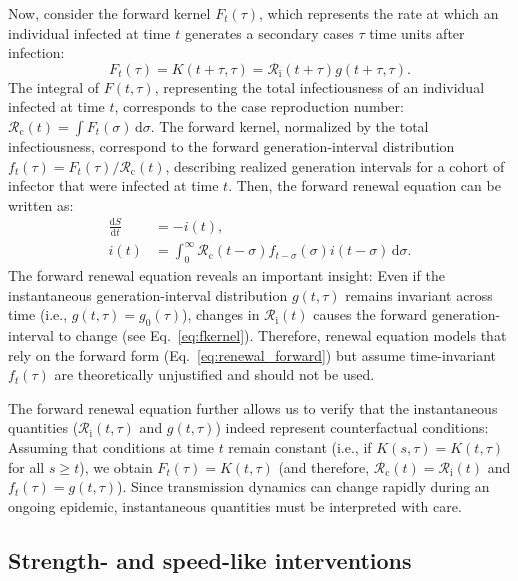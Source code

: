 \documentclass[12pt]{article}
\newcommand{\eref}[1]{Eq.~\ref{eq:#1}}
\newcommand{\Rx}[1]{\ensuremath{{\mathcal R}_{#1}}\xspace}
\newcommand{\Rc}{\Rx{\mathrm{c}}}
\newcommand{\Ri}{\Rx{\mathrm{i}}}
\newcommand{\dd}[1]{\ensuremath{\, \mathrm{d}#1}}
\newcommand{\dsigma}{\dd{\sigma}}
\begin{document}
Now, consider the forward kernel $F_t(\tau)$, which represents the rate at which an individual infected at time $t$ generates a secondary cases $\tau$ time units after infection: 
\begin{equation}
F_t(\tau) = K(t+\tau, \tau) = \Ri(t + \tau) g(t+\tau, \tau).
\label{eq:fkernel}
\end{equation}
The integral of $F(t, \tau)$, representing the total infectiousness of an individual infected at time $t$, corresponds to the case reproduction number: $\Rc(t) = \int F_t(\sigma) \dsigma$. 
The forward kernel, normalized by the total infectiousness, correspond to the forward generation-interval distribution $f_t(\tau) = F_t(\tau)/\Rc(t)$, describing realized generation intervals for a cohort of infector that were infected at time $t$.
Then, the forward renewal equation can be written as:
\begin{align}
\frac{\mathrm{d}S}{\mathrm{d}t} &= - i(t),\\
i(t) &= \int_0^\infty \Rc(t-\sigma) f_{t-\sigma}(\sigma) i(t-\sigma) \dsigma.
\label{eq:renewal_forward}
\end{align}
The forward renewal equation reveals an important insight: Even if the instantaneous generation-interval distribution $g(t, \tau)$ remains invariant across time (i.e., $g(t, \tau) = g_0(\tau)$), changes in $\Ri(t)$ causes the forward generation-interval to change (see \eref{fkernel}).
Therefore, renewal equation models that rely on the forward form (\eref{renewal_forward}) but assume time-invariant $f_t(\tau)$ are theoretically unjustified and should not be used.

The forward renewal equation further allows us to verify that the instantaneous quantities ($\Ri(t, \tau)$ and $g(t, \tau)$) indeed represent counterfactual conditions:
Assuming that conditions at time $t$ remain constant (i.e., if $K(s, \tau) = K(t, \tau)$ for all $s \geq t$), we obtain $F_{t}(\tau) = K(t, \tau)$ (and therefore, $\Rc(t) = \Ri(t)$ and $f_{t}(\tau) = g(t,\tau)$).
Since transmission dynamics can change rapidly during an ongoing epidemic, instantaneous quantities must be interpreted with care.

\subsection{Strength- and speed-like interventions}
\end{document}
